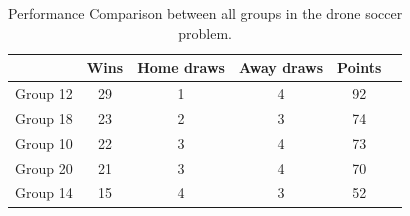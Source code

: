 \documentclass[a4paper,12pt]{article}
\begin{document}
\begin{table}[!hptb]
  \begin{center}
  \begin{tabular}{|c|c|c|c|c|c|}
  \hline
  & Wins & Home draws  & Away draws & Points  \\ \hline
  Group 12 & 29	& 1	& 4	& 92	\\ \hline
  Group 18  & 23	& 2	& 3	& 74  \\ \hline
  Group 10  & 22 &	3	& 4	& 73	 \\ \hline
  Group 20  & 21 &	3	& 4	& 70 \\ \hline
  Group 14  & 15	& 4	& 3	&52	\\ \hline
  \end{tabular}
  \caption{Performance Comparison between all groups in the drone soccer problem.}
  \label{tab:compare_results_soccer_drone}
  \end{center}
\end{table}
\end{document}
